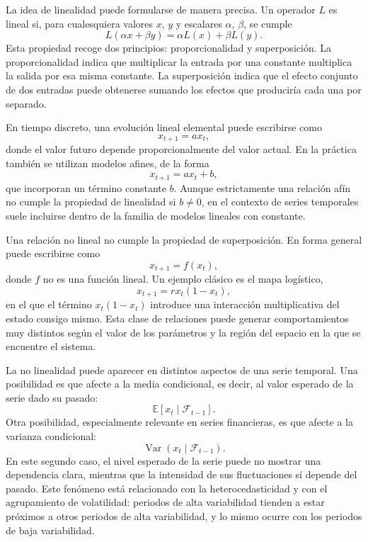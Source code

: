 La idea de linealidad puede formularse de manera precisa. Un operador \(L\) es lineal si, para cualesquiera valores \(x\), \(y\) y escalares \(\alpha\), \(\beta\), se cumple
\begin{equation}
    L(\alpha x + \beta y) = \alpha L(x) + \beta L(y).
\end{equation}
Esta propiedad recoge dos principios: proporcionalidad y superposición. La proporcionalidad indica que multiplicar la entrada por una constante multiplica la salida por esa misma constante. La superposición indica que el efecto conjunto de dos entradas puede obtenerse sumando los efectos que produciría cada una por separado.

En tiempo discreto, una evolución lineal elemental puede escribirse como
\begin{equation}
    x_{t+1} = a x_t,
\end{equation}
donde el valor futuro depende proporcionalmente del valor actual. En la práctica también se utilizan modelos afines, de la forma
\begin{equation}
    x_{t+1} = a x_t + b,
\end{equation}
que incorporan un término constante \(b\). Aunque estrictamente una relación afín no cumple la propiedad de linealidad si \(b \neq 0\), en el contexto de series temporales suele incluirse dentro de la familia de modelos lineales con constante.

Una relación no lineal no cumple la propiedad de superposición. En forma general puede escribirse como
\begin{equation}
    x_{t+1} = f(x_t),
\end{equation}
donde \(f\) no es una función lineal. Un ejemplo clásico es el mapa logístico,
\begin{equation}
    x_{t+1} = r x_t(1-x_t),
\end{equation}
en el que el término \(x_t(1-x_t)\) introduce una interacción multiplicativa del estado consigo mismo. Esta clase de relaciones puede generar comportamientos muy distintos según el valor de los parámetros y la región del espacio en la que se encuentre el sistema.

La no linealidad puede aparecer en distintos aspectos de una serie temporal. Una posibilidad es que afecte a la media condicional, es decir, al valor esperado de la serie dado su pasado:
\begin{equation}
    \mathbb{E}[x_t \mid \mathcal{F}_{t-1}].
\end{equation}
Otra posibilidad, especialmente relevante en series financieras, es que afecte a la varianza condicional:
\begin{equation}
    \operatorname{Var}(x_t \mid \mathcal{F}_{t-1}).
\end{equation}
En este segundo caso, el nivel esperado de la serie puede no mostrar una dependencia clara, mientras que la intensidad de sus fluctuaciones sí depende del pasado. Este fenómeno está relacionado con la heterocedasticidad y con el agrupamiento de volatilidad: periodos de alta variabilidad tienden a estar próximos a otros periodos de alta variabilidad, y lo mismo ocurre con los periodos de baja variabilidad.

